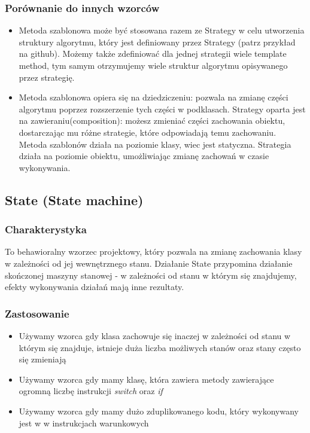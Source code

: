 \documentclass[a4paper,15pt]{article}
\begin{document}
\subsubsection{Porównanie do innych wzorców}
\begin{itemize}
\item Metoda szablonowa może być stosowana razem ze Strategy w celu utworzenia struktury algorytmu, który jest definiowany przez Strategy (patrz przykład na github). Możemy także zdefiniować dla jednej strategii wiele template method, tym samym otrzymujemy wiele struktur algorytmu opisywanego przez strategię.
\item Metoda szablonowa opiera się na dziedziczeniu: pozwala na zmianę części algorytmu poprzez rozszerzenie tych części w podklasach. Strategy oparta jest na zawieraniu(composition): możesz zmieniać części zachowania obiektu, dostarczając mu różne strategie, które odpowiadają temu zachowaniu. Metoda szablonów działa na poziomie klasy, wiec jest statyczna. Strategia działa na poziomie obiektu, umożliwiając zmianę zachowań w czasie wykonywania.
\end{itemize}




\newpage
\subsection{State (State machine)}

\subsubsection{Charakterystyka}
To behawioralny wzorzec projektowy, który pozwala na zmianę zachowania klasy w zależności od jej wewnętrznego stanu. Działanie State przypomina działanie skończonej maszyny stanowej - w zależności od stanu w którym się znajdujemy, efekty wykonywania działań mają inne rezultaty. 

\subsubsection{Zastosowanie}
\begin{itemize}
\item Używamy wzorca gdy klasa zachowuje się inaczej w zależności od stanu w którym się znajduje, istnieje duża liczba możliwych stanów oraz stany często się zmieniają
\item Używamy wzorca gdy mamy klasę, która zawiera metody zawierające ogromną liczbę instrukcji \textit{switch} oraz \textit{if}
\item Używamy wzorca gdy mamy dużo zduplikowanego kodu, który wykonywany jest w w instrukcjach warunkowych
\end{itemize}
\end{document}
